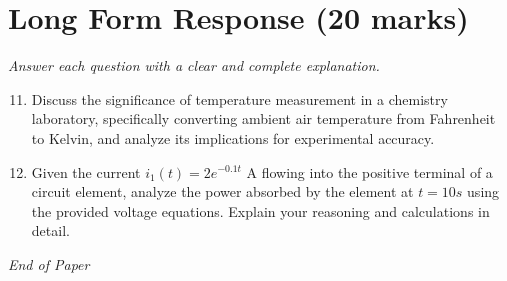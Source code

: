 \documentclass[12pt]{article}
\begin{document}
\section*{Long Form Response (20 marks)}
\textit{Answer each question with a clear and complete explanation.}
\begin{enumerate}[label=\arabic*.]
\setcounter{enumi}{10}
\item Discuss the significance of temperature measurement in a chemistry laboratory,
specifically converting ambient air temperature from Fahrenheit to Kelvin, and analyze its
implications for experimental accuracy.
\item Given the current \( i_1(t) = 2e^{-0.1t} \) A flowing into the positive terminal of a
circuit element, analyze the power absorbed by the element at \( t = 10s \) using the
provided voltage equations. Explain your reasoning and calculations in detail.
\end{enumerate}

\vfill
\noindent\textit{End of Paper}
\end{document}
